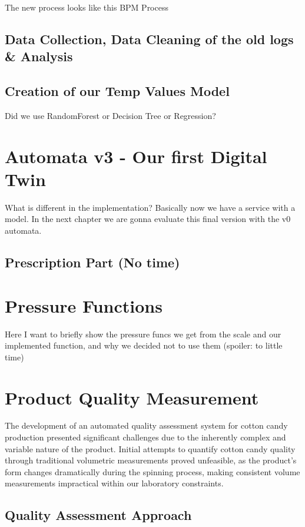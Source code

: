 The new process looks like this 
BPM Process
\subsection{Data Collection, Data Cleaning of the old logs \& Analysis}
\subsection{Creation of our Temp Values Model}
Did we use RandomForest or Decision Tree or Regression?




\section{Automata v3 - Our first Digital Twin}
What is different in the implementation? Basically now we have a service with a model. In the next chapter we are gonna evaluate this final version with the v0 automata.

\subsection{Prescription Part (No time)}



\section{Pressure Functions}
Here I want to briefly show the pressure funcs we get from the scale and our implemented function, and why we decided not to use them (spoiler: to little time)


\section{Product Quality Measurement}
The development of an automated quality assessment system for cotton candy production presented significant challenges due to the inherently complex and variable nature of the product. Initial attempts to quantify cotton candy quality through traditional volumetric measurements proved unfeasible, as the product's form changes dramatically during the spinning process, making consistent volume measurements impractical within our laboratory constraints.

\subsection{Quality Assessment Approach}

